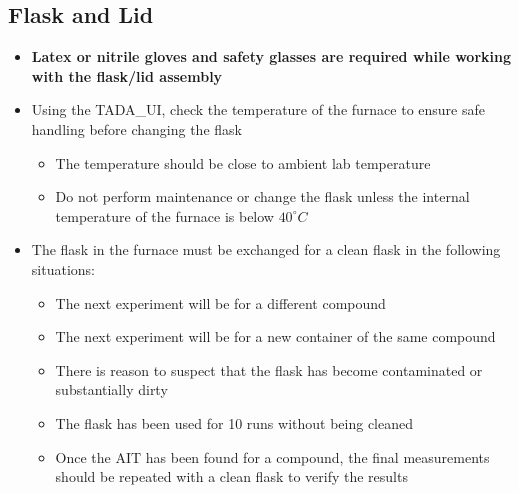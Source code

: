 \documentclass[letterpaper,11pt]{article}
\begin{document}
\subsection{Flask and Lid}
    \begin{itemize}
    \item \textbf{Latex or nitrile gloves and safety glasses are 
            required while working with the flask/lid assembly}
    
    \item Using the TADA\_UI, check the temperature of the furnace to ensure 
        safe handling before changing the flask
        \begin{itemize}
        \item The temperature should be close to ambient lab temperature
        \item Do not perform maintenance or change the flask unless the 
            internal temperature of the furnace is below $40^\circ C$
        \end{itemize}
    
    \item The flask in the furnace must be exchanged for a clean flask in the 
        following situations:
        \begin{itemize}
        \item The next experiment will be for a different compound
        \item The next experiment will be for a new container of the same 
            compound
        \item There is reason to suspect that the flask has become 
            contaminated or substantially dirty
        \item The flask has been used for 10 runs without being cleaned
        \item Once the AIT has been found for a compound, the final measurements
            should be repeated with a clean flask to verify the results
        \end{itemize}
    

\end{itemize}
\end{document}

